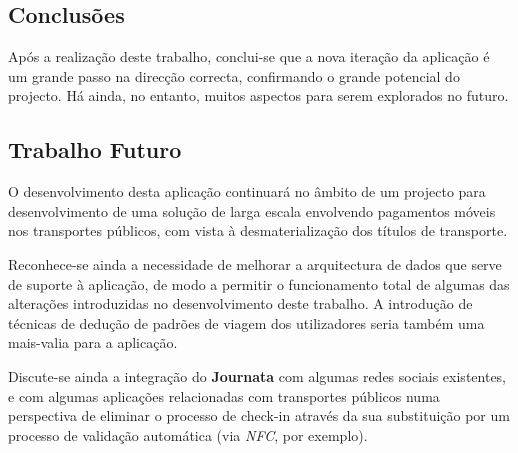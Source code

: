 \documentclass[9pt,a4paper]{extarticle}
\begin{document}
\begin{multicols}{2}
\section{Conclusões}\label{sec:conclui}

Após a realização deste trabalho, conclui-se que a nova iteração da aplicação é um grande passo na direcção correcta, confirmando o grande potencial do projecto. Há ainda, no entanto, muitos aspectos para serem explorados no futuro.

\subsection{Trabalho Futuro}
O desenvolvimento desta aplicação continuará no âmbito de um projecto para desenvolvimento de uma solução de larga escala envolvendo pagamentos móveis nos transportes públicos, com vista à desmaterialização dos títulos de transporte.

Reconhece-se ainda a necessidade de melhorar a arquitectura de dados que serve de suporte à aplicação, de modo a permitir o funcionamento total de algumas das alterações introduzidas no desenvolvimento deste trabalho. A introdução de técnicas de dedução de padrões de viagem dos utilizadores seria também uma mais-valia para a aplicação. 

Discute-se ainda a integração do \textbf{Journata} com algumas redes sociais existentes, e com algumas aplicações relacionadas com transportes públicos numa perspectiva de eliminar o processo de check-in através da sua substituição por um processo de validação automática (via \emph{NFC}, por exemplo).


%

\end{multicols}
\end{document}

